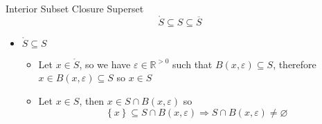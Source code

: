\begin{proposition}{Interior Subset Closure Superset}
  \[
    \mathring{S} \subseteq S \subseteq \overline{S}
  \]
  \begin{pf}
    \begin{itemize}
      \item $\mathring{S} \subseteq S$ 
        \begin{itemize}
          \item Let $x \in \mathring{S}$, so we have $\varepsilon \in \mathbb{R} ^{>0}$ such that $B\left(x, \varepsilon\right) \subseteq S$, therefore $x \in B\left(x, \varepsilon\right) \subseteq S$ so $x \in S$ 
          \item Let $x \in S$, then $x \in S \cap B\left(x, \varepsilon\right)$ so 
            \[
            \left\{ x \right\} \subseteq S \cap B\left(x, \varepsilon \right) \Rightarrow S \cap B\left(x, \varepsilon \right) \neq \varnothing
            \]
        \end{itemize}
    \end{itemize}
  \end{pf}
\end{proposition}
